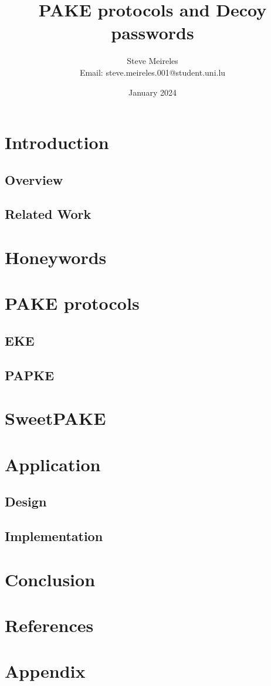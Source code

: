 \documentclass[10pt,journal]{IEEEtran}
\begin{document}
\title{PAKE protocols and Decoy passwords}
\author{Steve Meireles \\
Email: steve.meireles.001@student.uni.lu}
\date{January 2024}

\maketitle

\begin{abstract}
\end{abstract}

\begin{IEEEkeywords}
\end{IEEEkeywords}

\section{Introduction}
\subsection{Overview}
\subsection{Related Work}

\section{Honeywords}

\section{PAKE protocols}
\subsection{EKE}
\subsection{PAPKE}

\section{SweetPAKE}

\section{Application}
\subsection{Design}
\subsection{Implementation}

\section{Conclusion}

\section{References}

\section{Appendix}
\end{document}
